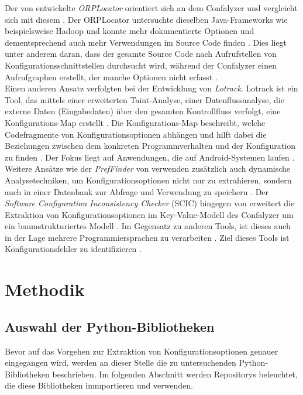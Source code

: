 \documentclass[german,bachelor]{swsLeipzig}
\begin{document}
Der von \citeauthor{7774519} entwickelte \textit{ORPLocator} orientiert sich an dem Confalyzer und vergleicht sich mit diesem \cite[S. 193]{7774519}.
Der ORPLocator untersuchte dieselben Java-Frameworks wie beispielsweise Hadoop und konnte mehr dokumentierte
Optionen und dementsprechend auch mehr Verwendungen im Source Code finden \cite[S. 193]{7774519}.
Dies liegt unter anderem daran, dass der gesamte Source Code nach Aufrufstellen von Konfigurationsschnittstellen durchsucht wird,
während der Confalyzer einen Aufrufgraphen erstellt, der manche Optionen nicht erfasst \cite[S. 193]{7774519}.\\

Einen anderen Ansatz verfolgten \citeauthor{8049300} bei der Entwicklung von \textit{Lotrack}.
Lotrack ist ein Tool, das mittels einer erweiterten Taint-Analyse, einer Datenflussanalyse, die externe Daten
(Eingabedaten) über den gesamten Kontrollfluss verfolgt, eine Konfigurations-Map erstellt \cite[S. 445]{8049300}.
Die Konfigurations-Map beschreibt, welche Codefragmente von Konfigurationsoptionen abhängen und hilft dabei die
Beziehungen zwischen dem konkreten Programmverhalten und der Konfiguration zu finden \cite[S. 447]{8049300}.
Der Fokus liegt auf Anwendungen, die auf Android-Systemen laufen \cite[S. 445]{8049300}. \\

Weitere Ansätze wie der \textit{PrefFinder} von \citeauthor{10.1145/2642937.2643009} verwenden zusätzlich auch dynamische
Analysetechniken, um Konfigurationsoptionen nicht nur zu extrahieren, sondern auch in einer Datenbank zur Abfrage und
Verwendung zu speichern \cite[S. 151]{10.1145/2642937.2643009}.
Der \textit{Software Configuration Inconsistency Checker} (SCIC) hingegen von \citeauthor{10.1145/2786805.2786869}
erweitert die Extraktion von Konfigurationsoptionen im Key-Value-Modell des Confalyzer um ein baumstrukturiertes Modell \cite[S. 295]{10.1145/2786805.2786869}.
Im Gegensatz zu anderen Tools, ist dieses auch in der Lage mehrere Programmiersprachen zu verarbeiten \cite[S. 295]{10.1145/2786805.2786869}.
Ziel dieses Tools ist Konfigurationsfehler zu identifizieren \cite[S. 295]{10.1145/2786805.2786869}.


\chapter{Methodik}\label{Methodik}


\section{Auswahl der Python-Bibliotheken}
Bevor auf das Vorgehen zur Extraktion von Konfigurationsoptionen genauer eingegangen wird, werden an dieser Stelle die
zu untersuchenden Python-Bibliotheken beschrieben.
Im folgenden Abschnitt werden Repositorys beleuchtet, die diese Bibliotheken immportieren und verwenden.\\
\end{document}

